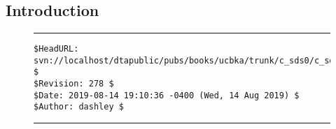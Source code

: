 
\chapter{\csdszerolongtitle{}}

\label{csds0}


\section{Introduction}



\noindent\begin{figure}[!b]
\noindent\rule[-0.25in]{\textwidth}{1pt}
\begin{tiny}
\begin{verbatim}
$HeadURL: svn://localhost/dtapublic/pubs/books/ucbka/trunk/c_sds0/c_sds0.tex $
$Revision: 278 $
$Date: 2019-08-14 19:10:36 -0400 (Wed, 14 Aug 2019) $
$Author: dashley $
\end{verbatim}
\end{tiny}
\noindent\rule[0.25in]{\textwidth}{1pt}
\end{figure}
%
